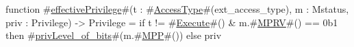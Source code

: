 function #\hyperref[sailRISCVzeffectivePrivilege]{effectivePrivilege}#(t : #\hyperref[sailRISCVzAccessType]{AccessType}#(ext_access_type), m : Mstatus, priv : Privilege) -> Privilege =
  if   t != #\hyperref[sailRISCVzExecute]{Execute}#() & m.#\hyperref[sailRISCVzMPRV]{MPRV}#() == 0b1
  then #\hyperref[sailRISCVzprivLevelzyofzybits]{privLevel\_of\_bits}#(m.#\hyperref[sailRISCVzMPP]{MPP}#())
  else priv
